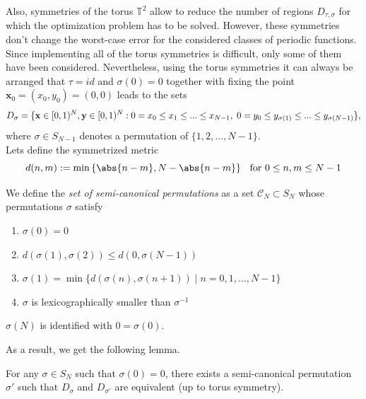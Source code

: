 Also, symmetries of the torus $\mathbb{T}^2$ allow to reduce the number of regions $D_{\tau,\sigma}$ for which the optimization problem has to be solved. However, these symmetries don't change the worst-case error for the considered classes of periodic functions. Since implementing all of the torus symmetries is difficult, only some of them have been considered. Nevertheless, using the torus symmetries it can always be arranged that $\tau = id$ and $\sigma(0) = 0$ together with fixing the point $\textbf{x}_0 = (x_0,y_0) = (0,0)$ leads to the sets
\begin{equation*}
    D_{\sigma} = \{ \textbf{x}\in [0,1)^N, \textbf{y}\in [0,1)^N : 0 = x_0 \leq x_1 \leq ... \leq x_{N-1}, \hspace{1mm} 0 = y_0 \leq y_{\sigma (1)} \leq ... \leq y_{\sigma (N-1)} \},
\end{equation*}
where $\sigma \in S_{N-1}$ denotes a permutation of $\{1,2,...,N-1\}$.\\

Lets define the symmetrized metric 
\begin{equation*}
    d(n,m) := \min{ \{\abs{n-m}, N-\abs{n-m} \}} \hspace{2mm} \text{ for } 0\leq n,m \leq N-1
\end{equation*}

\vspace{2mm}
\begin{Def}
    We define the \textit{set of semi-canonical permutations} as a set $\mathcal{C}_N \subset S_N$ whose permutations $\sigma$ satisfy
    \begin{enumerate}
        \item $\sigma(0) = 0$
        \item $d(\sigma(1),\sigma(2)) \leq d(0,\sigma(N-1))$
        \item $\sigma(1) = \min{ \{ d(\sigma(n),\sigma(n+1)) \mid n=0,1,...,N-1 \} }$
        \item $\sigma$ is lexicographically smaller than $\sigma^{-1}$
    \end{enumerate}
    $\sigma(N)$ is identified with $0=\sigma(0)$.
\end{Def}

\vspace{2mm}
As a result, we get the following lemma.\\

\begin{Lemma}
    For any $\sigma \in S_N$ such that $\sigma(0)=0$, there exists a semi-canonical permutation $\sigma'$ such that $D_{\sigma}$ and $D_{\sigma'}$ are equivalent (up to torus symmetry).
\end{Lemma}
\vspace{2mm}

